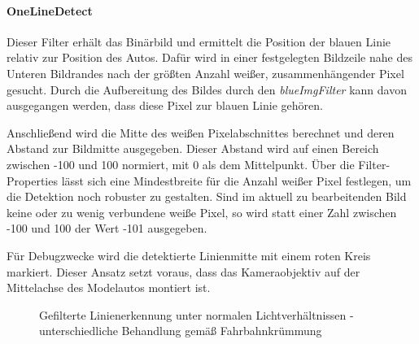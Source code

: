 \documentclass[12pt, a4paper]{scrartcl}
\begin{document}
\paragraph{OneLineDetect}
Dieser Filter erhält das Binärbild und ermittelt die Position der blauen Linie relativ zur Position des Autos. Dafür wird in einer festgelegten Bildzeile nahe des Unteren Bildrandes nach der größten Anzahl weißer, zusammenhängender Pixel gesucht. Durch die Aufbereitung des Bildes durch den \emph{blueImgFilter} kann davon ausgegangen werden, dass diese Pixel zur blauen Linie gehören. 

Anschließend wird die Mitte des weißen Pixelabschnittes berechnet und deren Abstand zur Bildmitte ausgegeben. Dieser Abstand wird auf einen Bereich zwischen -100 und 100 normiert, mit 0 als dem Mittelpunkt. Über die Filter-Properties lässt sich eine Mindestbreite für die Anzahl weißer Pixel festlegen, um die Detektion noch robuster zu gestalten. Sind im aktuell zu bearbeitenden Bild keine oder zu wenig verbundene weiße Pixel, so wird statt einer Zahl zwischen -100 und 100 der Wert -101 ausgegeben.

Für Debugzwecke wird die detektierte Linienmitte mit einem roten Kreis markiert. Dieser Ansatz setzt voraus, dass das Kameraobjektiv auf der Mittelachse des Modelautos montiert ist.

\begin{figure}
	\caption{Gefilterte Linienerkennung unter normalen Lichtverhältnissen - unterschiedliche Behandlung gemäß Fahrbahnkrümmung}
	\label{img:line_filt_normal_u_kurve}
\end{figure}
\end{document}
